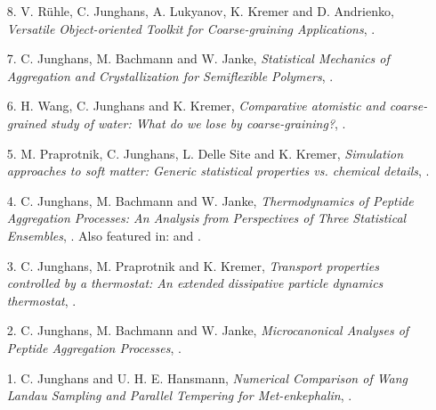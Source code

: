 \documentclass{article}
\begin{document}
\begin{enumerate}
\item[8.] V. R{\"u}hle, C. Junghans, A. Lukyanov, K. Kremer and D. Andrienko,
  \textit{Versatile Object-oriented Toolkit for Coarse-graining Applications},
  . 

\item[7.] C. Junghans, M. Bachmann and W. Janke,
  \textit{Statistical Mechanics of Aggregation and Crystallization for Semiflexible Polymers},
  .

\item[6.] H. Wang, C. Junghans and K. Kremer,
  \textit{Comparative atomistic and coarse-grained study of water: What do we lose by coarse-graining?},
  .

\item[5.] M. Praprotnik, C. Junghans, L. Delle Site and K. Kremer,
  \textit{Simulation approaches to soft matter: Generic statistical properties vs. chemical details},
  .

\item[4.] C. Junghans, M. Bachmann and W. Janke,
  \textit{Thermodynamics of Peptide Aggregation Processes: An Analysis from Perspectives of Three Statistical Ensembles},
   .
  Also featured in:  and .

\item[3.] C. Junghans, M. Praprotnik and K. Kremer,
  \textit{Transport properties controlled by a thermostat: An extended dissipative particle dynamics thermostat},
  .

\item[2.] C. Junghans, M. Bachmann and W. Janke,
  \textit{Microcanonical Analyses of Peptide Aggregation Processes},
  .

\item[1.] C. Junghans and U. H. E. Hansmann,
  \textit{Numerical Comparison of Wang Landau Sampling and Parallel Tempering for Met-enkephalin}, 
  .
\end{enumerate}
\end{document}
